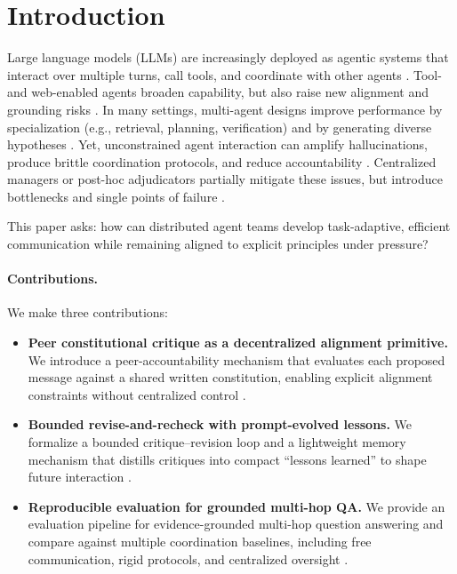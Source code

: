 \documentclass{article}
\theoremstyle{plain}
\theoremstyle{definition}
\begin{document}
\section{Introduction}
Large language models (LLMs) are increasingly deployed as agentic systems that interact over multiple turns, call tools, and coordinate with other agents \citep{yao2023react,shinn2023reflexion,paranjape2023art}. Tool- and web-enabled agents broaden capability, but also raise new alignment and grounding risks \citep{nakano2021webgpt,schick2023toolformer}. In many settings, multi-agent designs improve performance by specialization (e.g., retrieval, planning, verification) and by generating diverse hypotheses \citep{du2024debate,chan2023chateval}. Yet, unconstrained agent interaction can amplify hallucinations, produce brittle coordination protocols, and reduce accountability \citep{ji2023hallucination,zhou2023fact}. Centralized managers or post-hoc adjudicators partially mitigate these issues, but introduce bottlenecks and single points of failure \citep{park2023generative,wu2023autogen}.

This paper asks: how can distributed agent teams develop task-adaptive, efficient communication while remaining aligned to explicit principles under pressure?

\paragraph{Contributions.}
We make three contributions:
\begin{itemize}[leftmargin=*,nosep]
\item \textbf{Peer constitutional critique as a decentralized alignment primitive.} We introduce a peer-accountability mechanism that evaluates each proposed message against a shared written constitution, enabling explicit alignment constraints without centralized control \citep{bai2022constitutional}.
\item \textbf{Bounded revise-and-recheck with prompt-evolved lessons.} We formalize a bounded critique--revision loop and a lightweight memory mechanism that distills critiques into compact ``lessons learned'' to shape future interaction \citep{madaan2023selfrefine,shinn2023reflexion}.
\item \textbf{Reproducible evaluation for grounded multi-hop QA.} We provide an evaluation pipeline for evidence-grounded multi-hop question answering and compare against multiple coordination baselines, including free communication, rigid protocols, and centralized oversight \citep{yang2018hotpotqa,du2024debate}.
\end{itemize}
\end{document}
